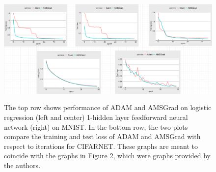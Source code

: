 \documentclass[letterpaper, 10 pt, conference]{ieeeconf}  %
\begin{document}
\begin{figure}[]
\centering
\begin{minipage}{0.9\textwidth}
  \centering
  \includegraphics[width=1\linewidth]{Fig4.png}
  \label{fig:test4}
\end{minipage}%
\caption[]{The top row shows performance of ADAM and AMSGrad on logistic regression (left and center) 1-hidden layer feedforward neural network (right) on MNIST. In the bottom row, the two plots compare the training and test loss of ADAM and AMSGrad with respect to iterations for CIFARNET. These graphs are meant to coincide with the graphs in Figure 2, which were graphs provided by the authors.} 
\end{figure} 
\end{document}
